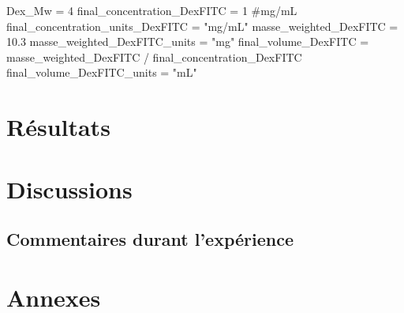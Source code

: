 \documentclass[a4paper,12pt]{article}
\newcommand{\PATH}[2]{"C:/Users/Florian/OneDrive - Universite de Montreal/LaTeX/BioTex/BioTex/#1/#2"}
\begin{document}

\begin{pycode}

Dex_Mw = 4
final_concentration_DexFITC = 1 #mg/mL
final_concentration_units_DexFITC = "mg/mL"
masse_weighted_DexFITC = 10.3 
masse_weighted_DexFITC_units = "mg"
final_volume_DexFITC = masse_weighted_DexFITC / final_concentration_DexFITC
final_volume_DexFITC_units = "mL"


\end{pycode}




\section{Résultats}

\section{Discussions}

\subsection{Commentaires durant l'expérience}


\newpage
\section{Annexes}


\printnomenclature
\end{document}
